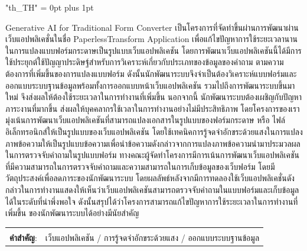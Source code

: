 \documentclass[12pt,oneside,openright,a4paper]{cpe-english-project}
\begin{document}
{
\XeTeXlinebreaklocale "th_TH"	
\XeTeXlinebreakskip = 0pt plus 1pt
\thaifont
\thaiabstract

Generative AI for Traditional Form Converter เป็นโครงการที่จัดทำขึ้นผ่านการพัฒนาผ่านเว็บแอปพลิเคชั่นในชื่อ PaperlessTransform Application
เพื่อแก้ไขปัญหาการใช้ระยะเวลานานในการแปลงแบบฟอร์มกระดาษเป็นรูปแบบเว็บแอปพลิเคชัน โดยการพัฒนาเว็บแอปพลิเคชันนี้ได้มีการใช้ประยุกต์ใช้ปัญญาประดิษฐ์สำหรับการวิเคราะห์เกี่ยวกับประเภทของข้อมูลของคำถาม 
ตามความต้องการที่เพิ่มขึ้นของการแปลงแบบฟอร์ม ดังนั้นนักพัฒนาระบบจึงจำเป็นต้องวิเคราะห์แบบฟอร์มและออกแบบระบบฐานข้อมูลพร้อมทั้งการออกแบบหน้าเว็บแอปพลิเคชัน รวมไปถึงการพัฒนาระบบขึ้นมาใหม่ 
จึงส่งผลให้ต้องใช้ระยะเวลาในการทำงานที่เพิ่มขึ้น นอกจากนี้ นักพัฒนาระบบต้องเผชิญกับปัญหาภาระงานที่มากขึ้น ส่งผลให้บุคคลากรใช้เวลาในการทำงานอย่างไม่มีประสิทธิภาพ 
โดยโครงการของเรามุ่งเน้นการพัฒนาเว็บแอปพลิเคชันที่สามารถแปลงเอกสารในรูปแบบของฟอร์มกระดาษ หรือ ไฟล์อิเล็กทรอนิกส์ให้เป็นรูปแบบของเว็บแอปพลิเคชัน 
โดยใช้เทคนิคการรู้จดจำอักขระด้วยแสงในการแปลงภาพข้อความให้เป็นรูปแบบข้อความเพื่อนำข้อความดังกล่าวจากการแปลงภาพข้อความนำมาประมวลผลในการตรวจจับคำถามในรูปแบบฟอร์ม 
ทางคณะผู้จัดทำโครงการมีการเน้นการพัฒนาเว็บแอปพลิเคชันที่มีความสามารถในการตรวจจับคำถามและความสามารถในการเก็บข้อมูลของเว็บฟอร์ม 
โดยมีวัตถุประสงค์เพื่อลดภาระของนักพัฒนาระบบ โดยผลลัพธ์หลังจากมีการทดลองใช้เว็บแอปพลิเคชั่นดังกล่าวในการทำงานแสดงให้เห็นว่าเว็บแอปพลิเคชันสามารถตรวจจับคำถามในแบบฟอร์มและเก็บข้อมูลได้ในระดับที่น่าพึ่งพอใจ ดังนั้นสรุปได้ว่าโครงการสามารถแก้ไขปัญหาการใช้ระยะเวลาในการทำงานที่เพิ่มขึ้น ของนักพัฒนาระบบได้อย่างมีนัยสำคัญ

\begin{flushleft}
\begin{tabular*}{\textwidth}{@{}lp{}}
 & \\

\textbf{คำสำคัญ}: & เว็บแอปพลิเคชัน / การรู้จดจำอักขระด้วยแสง /  ออกแบบระบบฐานข้อมูล
\end{tabular*}
\end{flushleft}
\endabstract
}
\end{document}
